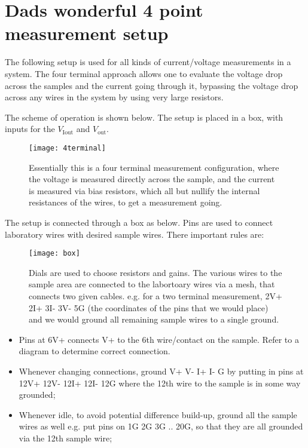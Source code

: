 \section{Dads wonderful 4 point measurement setup}
The  following  setup  is  used  for  all  kinds  of  current/voltage
measurements in  a system. The  four terminal approach allows  one to
evaluate the  voltage drop across  the samples and the  current going
through it, bypassing the voltage drop across any wires in the system
by using very large resistors.

The scheme of operation is shown below. The setup is placed in a box,
with inputs for the $ V_\text{Iout} $ and $ V_\text{out} $.

  \begin{figure}[h]
    \centering \texttt{[image: 4terminal]}
    \caption{Essentially   this  is   a  four   terminal  measurement
      configuration, where  the voltage  is measured  directly across
      the sample,  and the  current is  measured via  bias resistors,
      which all but nullify the internal resistances of the wires, to
      get a measurement going.}
    \label{fig:4t}
  \end{figure}

  The setup  is connected through  a box as  below. Pins are  used to
  connect laboratory wires with desired sample wires. There important
  rules are:


  \begin{figure}[h]
    \centering \texttt{[image: box]}
    \caption{Dials  are  used to  choose  resistors  and gains.   The
      various  wires  to  the  sample   area  are  connected  to  the
      labortoary  wires   via  a   mesh,  that  connects   two  given
      cables. e.g. for a two terminal measurement, 2V+ 2I+ 3I- 3V- 5G
      (the coordinates of the pins that  we would place) and we would
      ground all remaining sample wires to a single ground. }
    \label{fig:box}
  \end{figure}
  \begin{itemize}
  \item  Pins at  6V+  connects V+  to the  6th  wire/contact on  the
    sample. Refer to a diagram to determine correct connection.
  \item  Whenever changing  connections,  ground  V+ V-  I+  I- G  by
    putting in pins at 12V+ 12V- 12I+ 12I- 12G where the 12th wire to
    the sample is in some way grounded;
  \item Whenever idle, to avoid potential difference build-up, ground
    all the sample wires as well e.g. put pins on 1G 2G 3G .. 20G, so
    that they are all grounded via the 12th sample wire;
  \end{itemize}

